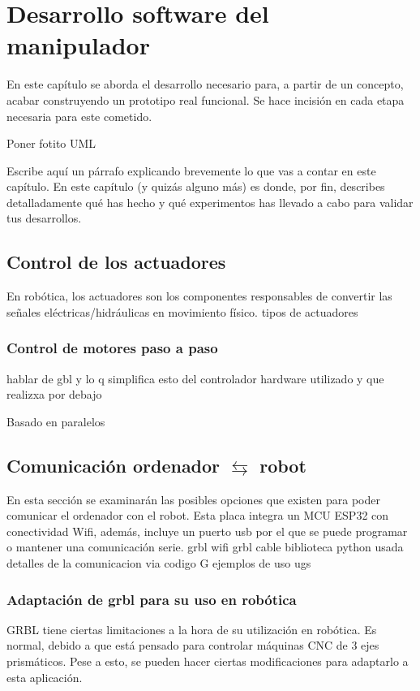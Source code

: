 \chapter{Desarrollo software del manipulador}
\label{cap:capitulo6}

\vspace{1cm}

En este capítulo se aborda el desarrollo necesario para, a partir de un concepto, acabar construyendo un prototipo real funcional. Se 
hace incisión en cada etapa necesaria para este cometido.

Poner fotito UML 

Escribe aquí un párrafo explicando brevemente lo que vas a contar en este capítulo. En este capítulo (y quizás alguno más) es donde, por fin, describes detalladamente qué has hecho y qué experimentos has llevado a cabo para validar tus desarrollos.

\section{Control de los actuadores}
En robótica, los actuadores son los componentes responsables de convertir las señales eléctricas/hidráulicas en movimiento físico. 
tipos de actuadores

\subsection{Control de motores paso a paso}
\label{subsec:control_pap}
hablar de gbl y lo q simplifica esto
del controlador hardware utilizado y que realizxa por debajo

Basado en paralelos

\section{Comunicación ordenador $\leftrightarrows$ robot}
En esta sección se examinarán las posibles opciones que existen para poder comunicar el ordenador con 
el robot.
Esta placa integra un MCU ESP32 con conectividad Wifi, además, incluye un puerto usb por el que se puede programar o mantener una 
comunicación serie. 
grbl wifi
grbl cable
biblioteca python usada
detalles de la comunicacion via codigo G
ejemplos de uso ugs 

\subsection{Adaptación de grbl para su uso en robótica}
GRBL tiene ciertas limitaciones a la hora de su utilización en robótica. Es normal, debido a que está pensado para controlar máquinas 
\acs{CNC} de 3 ejes prismáticos. Pese a esto, se pueden hacer ciertas modificaciones para adaptarlo a esta aplicación. 




